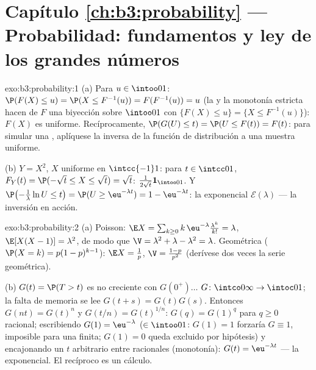 \section*{Capítulo \ref{ch:b3:probability} --- Probabilidad:
fundamentos y ley de los grandes números}

\begin{solution}{exo:b3:probability:1}
(a) Para $u \in \intoo01$: $\P(F(X) \leq u) = \P(X \leq
F^{-1}(u)) = F(F^{-1}(u)) = u$ (la
 y la monotonía estricta
hacen de $F$ una biyección sobre $\intoo01$ con
$\{F(X) \leq u\} = \{X \leq F^{-1}(u)\}$): $F(X)$ es uniforme.
Recíprocamente, $\P(G(U) \leq t) = \P(U \leq F(t)) = F(t)$: para simular
una , aplíquese la inversa de la
función de distribución a una muestra uniforme.

(b) $Y = X^2$, $X$ uniforme en $\intcc{-1}1$: para $t \in
\intcc01$, $F_Y(t) = \P(-\sqrt t \leq X \leq \sqrt t) = \sqrt
t$: 
$\frac1{2\sqrt t}\mathbf 1_{\intoo01}$. Y
$\P\bigl(-\frac1\lambda\ln U \leq t\bigr) = \P(U \geq
\eu^{-\lambda t}) = 1 - \eu^{-\lambda t}$: la exponencial
$\mathcal E(\lambda)$ --- la inversión en acción.
\end{solution}

\begin{solution}{exo:b3:probability:2}
(a) Poisson: $\E X = \sum_{k\geq0}k\,\eu^{-\lambda}
\frac{\lambda^k}{k!} = \lambda$, $\E[X(X-1)] = \lambda^2$, de modo que
$\V = \lambda^2 + \lambda - \lambda^2 = \lambda$. Geométrica
($\P(X = k) = p(1-p)^{k-1}$): $\E X = \frac1p$, $\V =
\frac{1-p}{p^2}$ (derívese dos veces la serie geométrica).

(b) $G(t) = \P(T > t)$ es no creciente con $G(0^+)\dots$
$G \colon \intco0\infty \to \intoc01$; la falta de memoria se lee
$G(t + s) = G(t)G(s)$. Entonces $G(n t) = G(t)^n$ y $G(t/n) =
G(t)^{1/n}$: $G(q) = G(1)^q$ para $q \geq 0$ racional; escribiendo
$G(1) = \eu^{-\lambda}$ ($\in \intoo01$: $G(1) = 1$ forzaría
$G \equiv 1$, imposible para una
 finita; $G(1) = 0$
queda excluido por hipótesis) y encajonando un $t$ arbitrario entre
racionales (monotonía): $G(t) =
\eu^{-\lambda t}$ --- la 
exponencial. El recíproco es un cálculo.
\end{solution}

